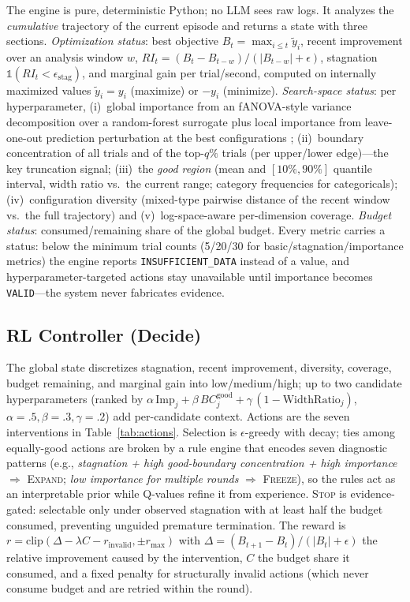 \documentclass[10pt]{article}
\begin{document}
The engine is pure, deterministic Python; no LLM sees raw logs. It
analyzes the \emph{cumulative} trajectory of the current episode and
returns a state with three sections. \emph{Optimization status}: best
objective $B_t=\max_{i\le t}\tilde y_i$, recent improvement over an
analysis window $w$, $RI_t=(B_t-B_{t-w})/(|B_{t-w}|+\epsilon)$,
stagnation $\mathbb{1}(RI_t<\epsilon_{\mathrm{stag}})$, and marginal gain
per trial/second, computed on internally maximized values
$\tilde y_i=y_i$ (maximize) or $-y_i$ (minimize). \emph{Search-space
status}: per hyperparameter, (i)~global importance from an fANOVA-style
variance decomposition over a random-forest surrogate plus local
importance from leave-one-out prediction perturbation at the best
configurations \cite{hutter2014efficient}; (ii)~boundary concentration of
all trials and of the top-$q\%$ trials (per upper/lower edge)---the key
truncation signal; (iii)~the \emph{good region} (mean and $[10\%,90\%]$
quantile interval, width ratio vs.\ the current range; category
frequencies for categoricals); (iv)~configuration diversity (mixed-type
pairwise distance of the recent window vs.\ the full trajectory) and
(v)~log-space-aware per-dimension coverage.
\emph{Budget status}: consumed/remaining share of the global budget.
Every metric carries a status: below the minimum trial counts (5/20/30
for basic/stagnation/importance metrics) the engine reports
\texttt{INSUFFICIENT\_DATA} instead of a value, and hyperparameter-targeted
actions stay unavailable until importance becomes \texttt{VALID}---the
system never fabricates evidence.

\subsection{RL Controller (Decide)}
\label{sec:rl}

The global state discretizes stagnation, recent improvement, diversity,
coverage, budget remaining, and marginal gain into low/medium/high; up to
two candidate hyperparameters (ranked by
$\alpha\,\mathrm{Imp}_j+\beta\,BC^{\mathrm{good}}_j+
\gamma\,(1-\mathrm{WidthRatio}_j)$, $\alpha=.5,\beta=.3,\gamma=.2$) add
per-candidate context. Actions are the seven interventions in
Table~\ref{tab:actions}. Selection is $\epsilon$-greedy with decay; ties
among equally-good actions are broken by a rule engine that encodes seven
diagnostic patterns (e.g., \emph{stagnation + high good-boundary
concentration + high importance} $\Rightarrow$ \textsc{Expand}; \emph{low
importance for multiple rounds} $\Rightarrow$ \textsc{Freeze}), so the
rules act as an interpretable prior while Q-values refine it from
experience. \textsc{Stop} is evidence-gated: selectable only under observed
stagnation with at least half the budget consumed, preventing unguided
premature termination. The reward is
$r=\mathrm{clip}(\Delta-\lambda C-r_{\mathrm{invalid}},\pm r_{\max})$ with
$\Delta=(B_{t+1}-B_t)/(|B_t|+\epsilon)$ the relative improvement caused by
the intervention, $C$ the budget share it consumed, and a fixed penalty
for structurally invalid actions (which never consume budget and are
retried within the round).
\end{document}
